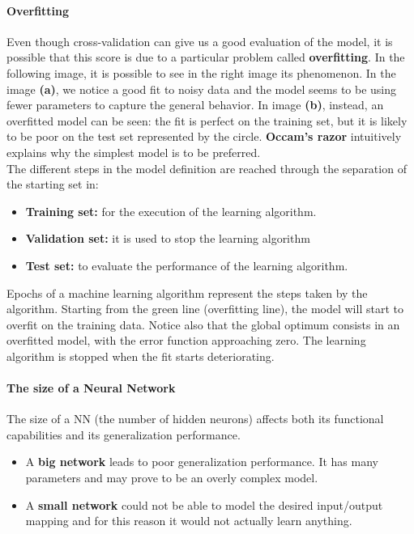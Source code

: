 \paragraph{Overfitting}
Even though cross-validation can give us a good evaluation of the model, it is possible that this score is due to a particular problem called \textbf{overfitting}. In the following image, it is possible to see in the right image its phenomenon.
In the image \textbf{(a)}, we notice a good fit to noisy data and the model seems to be using fewer parameters to capture the general behavior. In image \textbf{(b)}, instead, an overfitted model can be seen: the fit is perfect on the training set, but it is likely to be poor on the test set represented by the circle. \textbf{Occam's razor} intuitively explains why the simplest model is to be preferred.\\
The different steps in the model definition are reached through the separation of the starting set in:
\begin{itemize}
	\item \textbf{Training set:} for the execution of the learning algorithm.
	\item \textbf{Validation set:} it is used to stop the learning algorithm
	\item \textbf{Test set:} to evaluate the performance of the learning algorithm.
\end{itemize}
Epochs of a machine learning algorithm represent the steps taken by the algorithm. Starting from the green line (overfitting line), the model will start to overfit on the training data. Notice also that the global optimum consists in an overfitted model, with the error function approaching zero.
The learning algorithm is stopped when the fit starts deteriorating.

\paragraph*{The size of a Neural Network} 
The size of a NN (the number of hidden neurons) affects both its functional capabilities and its generalization performance.
\begin{itemize}
	\item A \textbf{big network} leads to poor generalization performance. It has many parameters and may prove to be an overly complex model.
	\item A \textbf{small network} could not be able to model the desired input/output mapping and for this reason it would not actually learn anything.
\end{itemize}

